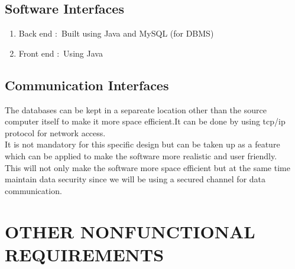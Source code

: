 \documentclass{article}
\begin{document}
\subsection{Software Interfaces}
\begin{enumerate}
\item Back end  $:$ Built using Java and MySQL (for DBMS)
\item Front end $:$ Using Java 
\end{enumerate}

\subsection{Communication Interfaces}
The databases can be kept in a separeate location other than the source computer itself to make it more space efficient.It can be done by using tcp/ip protocol for network access.
\\It is not mandatory for this specific design but can be taken up as a  feature which can be applied to make the software more realistic and user friendly.
\\This will not only make the software more space efficient but at the same time maintain data security since we will be using a secured channel for data communication.

\section{OTHER NONFUNCTIONAL REQUIREMENTS}
\end{document}
